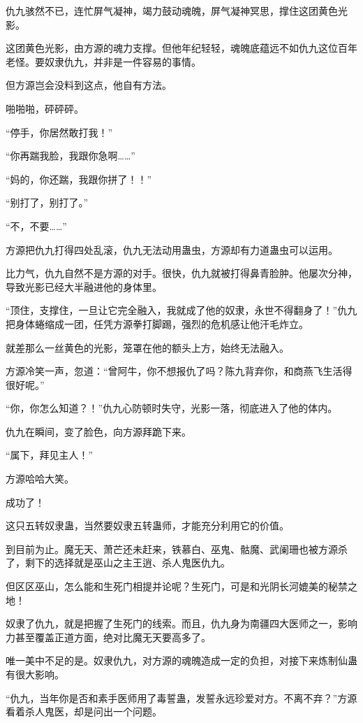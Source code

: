 
\begin{this_body}

仇九骇然不已，连忙屏气凝神，竭力鼓动魂魄，屏气凝神冥思，撑住这团黄色光影。

这团黄色光影，由方源的魂力支撑。但他年纪轻轻，魂魄底蕴远不如仇九这位百年老怪。要奴隶仇九，并非是一件容易的事情。

但方源岂会没料到这点，他自有方法。

啪啪啪，砰砰砰。

“停手，你居然敢打我！”

“你再踹我脸，我跟你急啊……”

“妈的，你还踹，我跟你拼了！！”

“别打了，别打了。”

“不，不要……”

方源把仇九打得四处乱滚，仇九无法动用蛊虫，方源却有力道蛊虫可以运用。

比力气，仇九自然不是方源的对手。很快，仇九就被打得鼻青脸肿。他屡次分神，导致光影已经大半融进他的身体里。

“顶住，支撑住，一旦让它完全融入，我就成了他的奴隶，永世不得翻身了！”仇九把身体蜷缩成一团，任凭方源拳打脚踢，强烈的危机感让他汗毛炸立。

就差那么一丝黄色的光影，笼罩在他的额头上方，始终无法融入。

方源冷笑一声，忽道：“曾阿牛，你不想报仇了吗？陈九背弃你，和商燕飞生活得很好呢。”

“你，你怎么知道？！”仇九心防顿时失守，光影一落，彻底进入了他的体内。

仇九在瞬间，变了脸色，向方源拜跪下来。

“属下，拜见主人！”

方源哈哈大笑。

成功了！

这只五转奴隶蛊，当然要奴隶五转蛊师，才能充分利用它的价值。

到目前为止。魔无天、萧芒还未赶来，铁慕白、巫鬼、骷魔、武阑珊也被方源杀了，剩下的选择就是巫山之主王逍、杀人鬼医仇九。

但区区巫山，怎么能和生死门相提并论呢？生死门，可是和光阴长河媲美的秘禁之地！

奴隶了仇九，就是把握了生死门的线索。而且，仇九身为南疆四大医师之一，影响力甚至覆盖正道方面，绝对比魔无天要高多了。

唯一美中不足的是。奴隶仇九，对方源的魂魄造成一定的负担，对接下来炼制仙蛊有很大影响。

“仇九，当年你是否和素手医师用了毒誓蛊，发誓永远珍爱对方。不离不弃？”方源看着杀人鬼医，却是问出一个问题。


\end{this_body}
